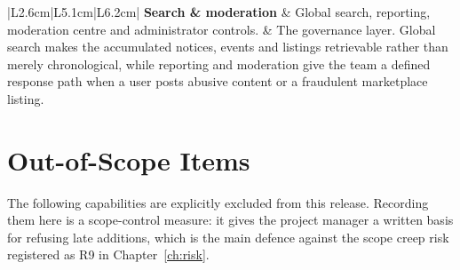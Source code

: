\documentclass[11pt,a4paper]{report}
\begin{document}
\begin{longtable}{|L{2.6cm}|L{5.1cm}|L{6.2cm}|}
\textbf{Search \& moderation} &
Global search, reporting, moderation centre and administrator controls. &
The governance layer. Global search makes the accumulated notices, events and
listings retrievable rather than merely chronological, while reporting and
moderation give the team a defined response path when a user posts abusive
content or a fraudulent marketplace listing. \\ \hline

\end{longtable}

\section{Out-of-Scope Items}

The following capabilities are explicitly excluded from this release. Recording
them here is a scope-control measure: it gives the project manager a written
basis for refusing late additions, which is the main defence against the scope
creep risk registered as R9 in Chapter~\ref{ch:risk}.
\end{document}
